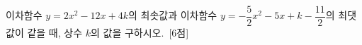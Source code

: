 이차함수 $y=2x^2-12x+4k$의 최솟값과 이차함수 $y=-\dfrac{5}{2}x^2-5x+k-\dfrac{11}{2}$의 최댓값이 같을 때, 상수 $k$의 값을 구하시오.~\mbox{\mbox{[6점]}}
